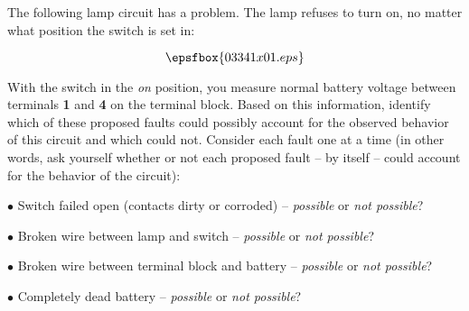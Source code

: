 

The following lamp circuit has a problem.  The lamp refuses to turn on, no matter what position the switch is set in:

$$\epsfbox{03341x01.eps}$$

With the switch in the {\it on} position, you measure normal battery voltage between terminals {\bf 1} and {\bf 4} on the terminal block.  Based on this information, identify which of these proposed faults could possibly account for the observed behavior of this circuit and which could not.  Consider each fault one at a time (in other words, ask yourself whether or not each proposed fault -- by itself -- could account for the behavior of the circuit):

\medskip
\item{$\bullet$} Switch failed open (contacts dirty or corroded) -- {\it possible} or {\it not possible}? 
\item{$\bullet$} Broken wire between lamp and switch -- {\it possible} or {\it not possible}?
\item{$\bullet$} Broken wire between terminal block and battery -- {\it possible} or {\it not possible}?
\item{$\bullet$} Completely dead battery -- {\it possible} or {\it not possible}?
\medskip







